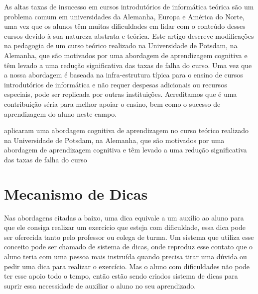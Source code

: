 As altas taxas de insucesso em cursos introdutórios de informática teórica são um problema comum em universidades da Alemanha, Europa e América do Norte, uma vez que os alunos têm muitas dificuldades em lidar com o conteúdo desses cursos devido à sua natureza abstrata e teórica. Este artigo descreve modificações na pedagogia de um curso teórico realizado na Universidade de Potsdam, na Alemanha, que são motivados por uma abordagem de aprendizagem cognitiva e têm levado a uma redução significativa das taxas de falha do curso. Uma vez que a nossa abordagem é baseada na infra-estrutura típica para o ensino de cursos introdutórios de informática e não requer despesas adicionais ou recursos especiais, pode ser replicada por outras instituições. Acreditamos que é uma contribuição séria para melhor apoiar o ensino, bem como o sucesso de aprendizagem do aluno neste campo.

 aplicaram uma abordagem cognitiva de aprendizagem no curso teórico realizado na Universidade de Potsdam, na Alemanha, que são motivados por uma abordagem de aprendizagem cognitiva e têm levado a uma redução significativa das taxas de falha do curso 

\section{Mecanismo de Dicas}

Nas abordagens citadas a baixo, uma dica equivale a um auxílio ao aluno para que ele consiga realizar um exercício que esteja com dificuldade, essa dica pode ser oferecida tanto pelo professor ou colega de turma. Um sistema que utiliza esse conceito pode ser chamado de sistema de dicas, onde reproduz esse contato que o aluno teria com uma pessoa mais instruída quando precisa tirar uma dúvida ou pedir uma dica para realizar o exercício. Mas o aluno com dificuldades não pode ter esse apoio todo o tempo, então estão sendo criados sistema de dicas para suprir essa necessidade de auxiliar o aluno no seu aprendizado.

